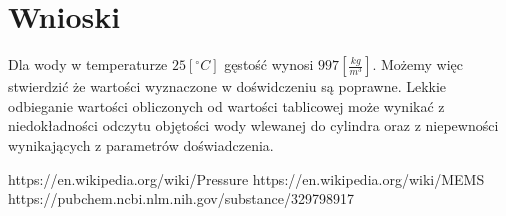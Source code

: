 \documentclass[11pt]{article}
\begin{document}
    \section{Wnioski}
    \par Dla wody w temperaturze $25 [^\circ C]$ gęstość wynosi $997 [\frac{kg}{m^3}]$. Możemy więc stwierdzić że wartości
    wyznaczone w doświdczeniu są poprawne. Lekkie odbieganie wartości obliczonych od wartości tablicowej może wynikać z niedokładności
    odczytu objętości wody wlewanej do cylindra oraz z niepewności wynikających z parametrów doświadczenia.

    \vfill
    \footnotesize
    \begin{thebibliography}{3}
        https://en.wikipedia.org/wiki/Pressure
        https://en.wikipedia.org/wiki/MEMS
        https://pubchem.ncbi.nlm.nih.gov/substance/329798917
    \end{thebibliography}

    \newpage
    \begin{center}
        \Large{}
    \end{center}
\end{document}

